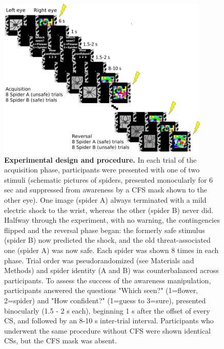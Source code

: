 \documentclass[12pt]{article}
\begin{document}
\clearpage
\begin{figure}[htbp]
\centering
\includegraphics[width=0.9\textwidth]{cfs_revtask.pdf}
\caption{\label{fig:org8bbeaee}
\textbf{Experimental design and procedure.} In each trial of the acquisition phase, participants were presented with one of two stimuli (schematic pictures of spiders, presented monocularly for 6 sec and suppressed from awareness by a CFS mask shown to the other eye). One image (spider A) always terminated with a mild electric shock to the wrist, whereas the other (spider B) never did. Halfway through the experiment, with no warning, the contingencies flipped and the reversal phase began: the formerly safe stimulus (spider B) now predicted the shock, and the old threat-associated one (spider A) was now safe. Each spider was shown 8 times in each phase. Trial order was pseudorandomized (see Materials and Methods) and spider identity (A and B) was counterbalanced across participants. To assess the success of the awareness manipulation, participants answered the questions "Which seen?" (1=flower, 2=spider) and "How confident?" (1=guess to 3=sure), presented binocularly (1.5 - 2 s each), beginning 1 s after the offset of every CS, and followed by an 8-10 s inter-trial interval. Participants who underwent the same procedure without CFS were shown identical CSs, but the CFS mask was absent.}
\end{figure}
\end{document}
